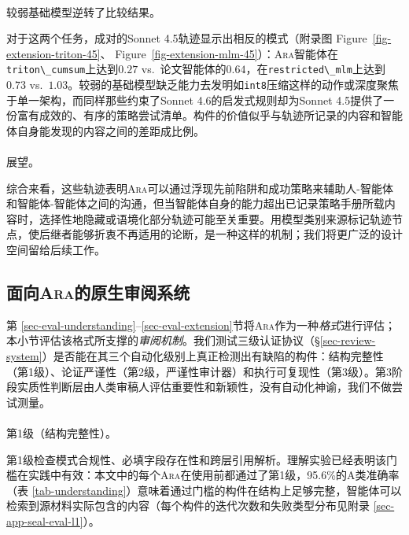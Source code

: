 \documentclass[
]{article}
\makeatletter
\let\oldparagraph\paragraph
\renewcommand{\paragraph}{
    \@ifstar
      \xxxParagraphStar
      \xxxParagraphNoStar
  }
\newcommand{\xxxParagraphStar}[1]{\oldparagraph*{#1}\mbox{}}
\newcommand{\xxxParagraphNoStar}[1]{\oldparagraph{#1}\mbox{}}
\newcommand{\passthrough}[1]{#1}
\theoremstyle{definition}
\newcommand{\ara}{\textsc{Ara}}
\makeatother
\begin{document}
\paragraph{较弱基础模型逆转了比较结果。}\label{ux8f83ux5f31ux57faux7840ux6a21ux578bux9006ux8f6cux4e86ux6bd4ux8f83ux7ed3ux679c}

对于这两个任务，成对的Sonnet 4.5轨迹显示出相反的模式（附录图
Figure~\ref{fig-extension-triton-45}、
Figure~\ref{fig-extension-mlm-45}）：\ara{}智能体在\passthrough{\lstinline!triton\_cumsum!}上达到\(0.27\)
vs.~论文智能体的\(0.64\)，在\passthrough{\lstinline!restricted\_mlm!}上达到\(0.73\)
vs.~\(1.03\)。较弱的基础模型缺乏能力去发明如\passthrough{\lstinline!int8!}压缩这样的动作或深度聚焦于单一架构，而同样那些约束了Sonnet
4.6的启发式规则却为Sonnet
4.5提供了一份富有成效的、有序的策略尝试清单。构件的价值似乎与轨迹所记录的内容和智能体自身能发现的内容之间的差距成比例。

\paragraph{展望。}\label{ux5c55ux671b}

综合来看，这些轨迹表明\ara{}可以通过浮现先前陷阱和成功策略来辅助人-智能体和智能体-智能体之间的沟通，但当智能体自身的能力超出已记录策略手册所载内容时，选择性地隐藏或语境化部分轨迹可能至关重要。用模型类别来源标记轨迹节点，使后继者能够折衷不再适用的论断，是一种这样的机制；我们将更广泛的设计空间留给后续工作。

\subsection{\texorpdfstring{面向\ara{}的原生审阅系统}{面向的原生审阅系统}}\label{sec-eval-seal}

第
\ref{sec-eval-understanding}--\ref{sec-eval-extension}节将\ara{}作为一种\emph{格式}进行评估；本小节评估该格式所支撑的\emph{审阅机制}。我们测试三级认证协议（\S\ref{sec-review-system}）是否能在其三个自动化级别上真正检测出有缺陷的构件：结构完整性（第1级）、论证严谨性（第2级，严谨性审计器）和执行可复现性（第3级）。第3阶段实质性判断层由人类审稿人评估重要性和新颖性，没有自动化神谕，我们不做尝试测量。

\paragraph{第1级（结构完整性）。}\label{ux7b2c1ux7ea7ux7ed3ux6784ux5b8cux6574ux6027}

第1级检查模式合规性、必填字段存在性和跨层引用解析。理解实验已经表明该门槛在实践中有效：本文中的每个\ara{}在使用前都通过了第1级，95.6\%的A类准确率（表
\ref{tab-understanding}）意味着通过门槛的构件在结构上足够完整，智能体可以检索到源材料实际包含的内容（每个构件的迭代次数和失败类型分布见附录
\ref{sec-app-seal-eval-l1}）。
\end{document}
